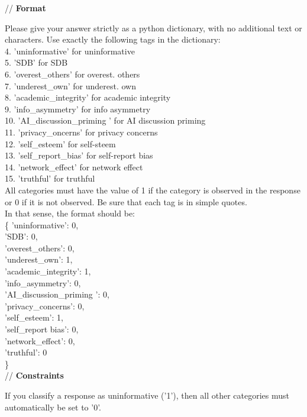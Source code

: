 \documentclass[11pt]{article}
\begin{document}
\begin{sloppypar}
\begin{appendices}
\begin{tcolorbox}
// \textbf{Format}

Please give your answer strictly as a python dictionary, with no additional text or characters. Use exactly the following tags in the dictionary:\\
4.	'uninformative' for uninformative\\
5.	'SDB' for SDB\\
6.	'overest\_others' for overest. others\\
7.	'underest\_own' for underest. own\\
8.	'academic\_integrity' for academic integrity\\
9.	'info\_asymmetry' for info asymmetry\\
10.	'AI\_discussion\_priming ' for AI discussion priming\\
11.	'privacy\_oncerns' for privacy concerns\\
12.	'self\_esteem' for self-steem\\
13.	'self\_report\_bias' for self-report bias\\
14.	'network\_effect' for network effect\\
15.	'truthful' for truthful\\

All categories must have the value of 1 if the category is observed in the response or 0 if it is not observed. 
Be sure that each tag is in simple quotes. \\

In that sense, the format should be:\\
\{
    'uninformative': 0,\\
    'SDB': 0,\\
    'overest\_others': 0,\\
    'underest\_own': 1,\\
    'academic\_integrity': 1,\\
    'info\_asymmetry': 0,\\
    'AI\_discussion\_priming ': 0,\\
    'privacy\_concerns': 0,\\
    'self\_esteem': 1,\\
    'self\_report bias': 0,\\
    'network\_effect': 0,\\
    'truthful': 0\\
\}\\


// \textbf{Constraints}

If you classify a response as uninformative ('1'), then all other categories must automatically be set to '0'.\\


\end{tcolorbox}
\end{appendices}
\end{sloppypar}
\end{document}
